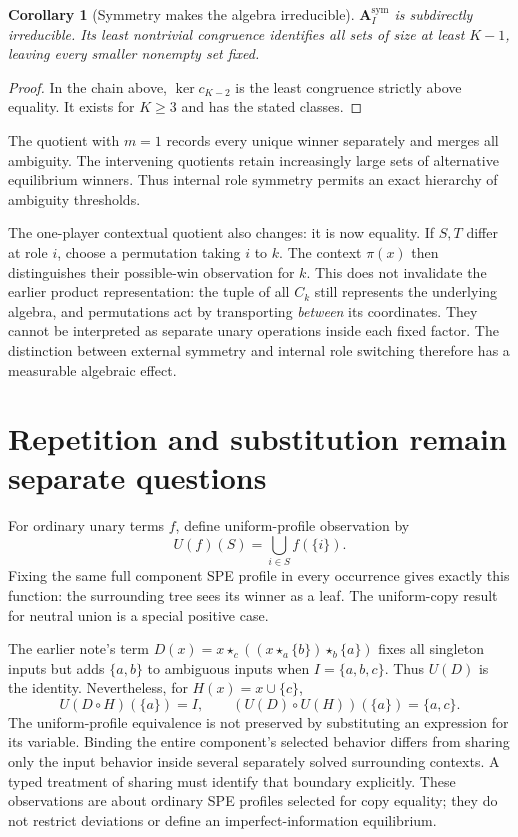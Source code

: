 \documentclass[11pt]{article}
\newtheorem{corollary}[theorem]{Corollary}
\newcommand{\A}{\mathbf A_I}
\newcommand{\ow}[1]{\mathbin{\star_{#1}}}
\begin{document}
\begin{corollary}[Symmetry makes the algebra irreducible]
$\A^{\mathrm{sym}}$ is subdirectly irreducible. Its least nontrivial
congruence identifies all sets of size at least $K-1$, leaving every
smaller nonempty set fixed.
\end{corollary}
\begin{proof}
In the chain above, $\ker c_{K-2}$ is the least congruence strictly above
equality. It exists for $K\geq3$ and has the stated classes.
\end{proof}

The quotient with $m=1$ records every unique winner separately and merges
all ambiguity. The intervening quotients retain increasingly large sets
of alternative equilibrium winners. Thus internal role symmetry permits
an exact hierarchy of ambiguity thresholds.

The one-player contextual quotient also changes: it is now equality.
If $S,T$ differ at role $i$, choose a permutation taking $i$ to $k$.
The context $\pi(x)$ then distinguishes their possible-win observation
for $k$. This does not invalidate the earlier product representation:
the tuple of all $C_k$ still represents the underlying algebra, and
permutations act by transporting \emph{between} its coordinates. They
cannot be interpreted as separate unary operations inside each fixed
factor. The distinction between external symmetry and internal role
switching therefore has a measurable algebraic effect.

\section{Repetition and substitution remain separate questions}

For ordinary unary terms $f$, define uniform-profile observation by
\[
 U(f)(S)=\bigcup_{i\in S}f(\{i\}).
\]
Fixing the same full component SPE profile in every occurrence gives
exactly this function: the surrounding tree sees its winner as a leaf.
The uniform-copy result for neutral union is a special positive case.

The earlier note's term
$D(x)=x\ow c((x\ow a\{b\})\ow b\{a\})$ fixes all singleton inputs but
adds $\{a,b\}$ to ambiguous inputs when $I=\{a,b,c\}$. Thus $U(D)$ is
the identity. Nevertheless, for $H(x)=x\cup\{c\}$,
\[
 U(D\circ H)(\{a\})=I,\qquad
 (U(D)\circ U(H))(\{a\})=\{a,c\}.
\]
The uniform-profile equivalence is not preserved by substituting an
expression for its variable. Binding the entire component's selected
behavior differs from sharing only the input behavior inside several
separately solved surrounding contexts. A typed treatment of sharing
must identify that boundary explicitly. These observations are about
ordinary SPE profiles selected for copy equality; they do not restrict
deviations or define an imperfect-information equilibrium.
\end{document}
